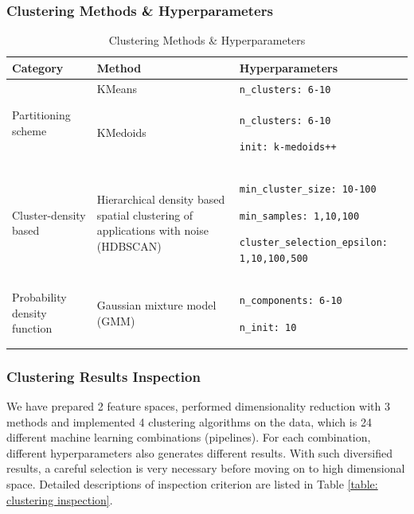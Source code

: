 \documentclass[a4paper]{article}
\begin{document}
\subsubsection{Clustering Methods \& Hyperparameters}

\begin{table}[h!]
    \centering
    \caption{Clustering Methods \& Hyperparameters}
    \begin{tabular}{p{}|p{}|p{}}
    \hline \hline
        \textbf{Category} & \textbf{Method} & \textbf{Hyperparameters} \\
        \hline
        \multirow{2}{.3\textwidth}{Partitioning scheme} & KMeans & \texttt{n\_clusters: 6-10} \\
        & KMedoids & \texttt{n\_clusters: 6-10} \par \texttt{init: k-medoids++} \\
        \hline
        Cluster-density based & Hierarchical density based spatial clustering of applications with noise (HDBSCAN) & \texttt{min\_cluster\_size: 10-100} \par \texttt{min\_samples: 1,10,100} \par \texttt{cluster\_selection\_epsilon: 1,10,100,500} \\
        \hline
        Probability density function & Gaussian mixture model (GMM) & \texttt{n\_components: 6-10} \par \texttt{n\_init: 10} \\
        \hline \hline
    \end{tabular}
    \label{table: clustering methods}
\end{table}

\subsubsection{Clustering Results Inspection} \label{sec: clustering inspection}
We have prepared 2 feature spaces, performed dimensionality reduction with 3 methods and implemented 4 clustering algorithms on the data, which is 24 different machine learning combinations (pipelines). For each combination, different hyperparameters also generates different results. With such diversified results, a careful selection is very necessary before moving on to high dimensional space. Detailed descriptions of inspection criterion are listed in Table \ref{table: clustering inspection}.
\end{document}
